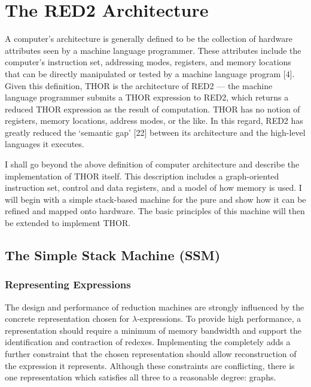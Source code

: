 \chapter{The RED2 Architecture}


A computer's architecture is generally defined to be the collection of hardware attributes seen by a machine language programmer. These attributes include the computer's instruction set, addressing modes, registers, and memory locations that can be directly manipulated or tested by a machine language program [4]. Given this definition, THOR is the architecture of RED2 --- the machine language programmer submits a THOR expression to RED2, which returns a reduced THOR expression as the result of computation. THOR has no notion of registers, memory locations, address modes, or the like. In this regard, RED2 has greatly reduced the `semantic gap' [22] between its architecture and the high-level languages it executes.

I shall go beyond the above definition of computer architecture and describe the implementation of THOR itself. This description includes a graph-oriented instruction set, control and data registers, and a model of how memory is used. I will begin with a simple stack-based machine for the pure \lambdacalculus{} and show how it can be refined and mapped onto hardware. The basic principles of this machine will then be extended to implement THOR.

\section{The Simple Stack Machine (SSM)}

\subsection{Representing Expressions}

The design and performance of reduction machines are strongly influenced by the concrete representation chosen for \(\lambda\)-expressions. To provide high performance, a representation should require a minimum of memory bandwidth and support the identification and contraction of redexes. Implementing the \lambdabetacalculus{} completely adds a further constraint that the chosen representation should allow reconstruction of the expression it represents. Although these constraints are conflicting, there is one representation which satisfies all three to a reasonable degree: graphs.

